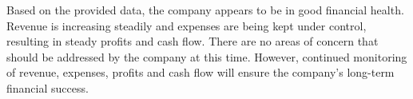 

Based on the provided data, the company appears to be in good financial health. Revenue is increasing steadily and expenses are being kept under control, resulting in steady profits and cash flow. There are no areas of concern that should be addressed by the company at this time. However, continued monitoring of revenue, expenses, profits and cash flow will ensure the company's long-term financial success.